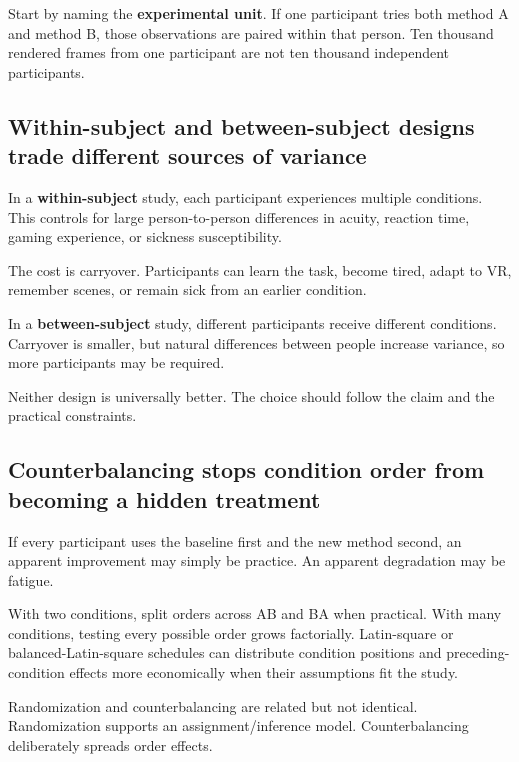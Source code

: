 Start by naming the \textbf{experimental unit}. If one participant tries both method A and method B, those observations are paired within that person. Ten thousand rendered frames from one participant are not ten thousand independent participants.

\subsection{Within-subject and between-subject designs trade different sources of variance}\label{04-visual-computing-ii-ch035-within-subject-and-between-subject-designs-trade-different-sources-of-variance}

In a \textbf{within-subject} study, each participant experiences multiple conditions. This controls for large person-to-person differences in acuity, reaction time, gaming experience, or sickness susceptibility.

The cost is carryover. Participants can learn the task, become tired, adapt to VR, remember scenes, or remain sick from an earlier condition.

In a \textbf{between-subject} study, different participants receive different conditions. Carryover is smaller, but natural differences between people increase variance, so more participants may be required.

Neither design is universally better. The choice should follow the claim and the practical constraints.

\subsection{Counterbalancing stops condition order from becoming a hidden treatment}\label{04-visual-computing-ii-ch035-counterbalancing-stops-condition-order-from-becoming-a-hidden-treatment}

If every participant uses the baseline first and the new method second, an apparent improvement may simply be practice. An apparent degradation may be fatigue.

With two conditions, split orders across AB and BA when practical. With many conditions, testing every possible order grows factorially. Latin-square or balanced-Latin-square schedules can distribute condition positions and preceding-condition effects more economically when their assumptions fit the study.

Randomization and counterbalancing are related but not identical. Randomization supports an assignment/inference model. Counterbalancing deliberately spreads order effects.

